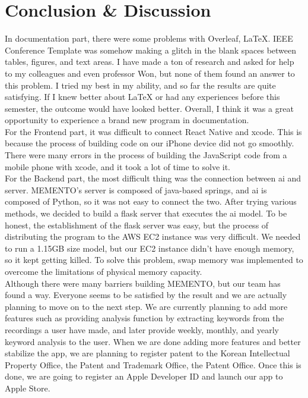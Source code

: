\documentclass[conference]{IEEEtran}
\begin{document}
\section{Conclusion \& Discussion}
\indent In documentation part, there were some problems with Overleaf, LaTeX. IEEE Conference Template was somehow making a glitch in the blank spaces between tables, figures, and text areas. I have made a ton of research and asked for help to my colleagues and even professor Won, but none of them found an answer to this problem. I tried my best in my ability, and so far the results are quite satisfying. If I knew better about LaTeX or had any experiences before this semester, the outcome would have looked better. Overall, I think it was a great opportunity to experience a brand new program in documentation.\\
\indent For the Frontend part, it was difficult to connect React Native and xcode. This is because the process of building code on our iPhone device did not go smoothly. There were many errors in the process of building the JavaScript code from a mobile phone with xcode, and it took a lot of time to solve it.\\
\indent For the Backend part, the most difficult thing was the connection between ai and server. MEMENTO's server is composed of java-based springs, and ai is composed of Python, so it was not easy to connect the two. After trying various methods, we decided to build a flask server that executes the ai model. To be honest, the establishment of the flask server was easy, but the process of distributing the program to the AWS EC2 instance was very difficult. We needed to run a 1.15GB size model, but our EC2 instance didn't have enough memory, so it kept getting killed. To solve this problem, swap memory was implemented to overcome the limitations of physical memory capacity.\\
\indent Although there were many barriers building MEMENTO, but our team has found a way. Everyone seems to be satisfied by the result and we are actually planning to move on to the next step. We are currently planning to add more features such as providing analysis function by extracting keywords from the recordings a user have made, and later provide weekly, monthly, and yearly keyword analysis to the user. When we are done adding more features and better stabilize the app, we are planning to register patent to the Korean Intellectual Property Office, the Patent and Trademark Office, the Patent Office. Once this is done, we are going to register an Apple Developer ID and launch our app to Apple Store. 
\end{document}
